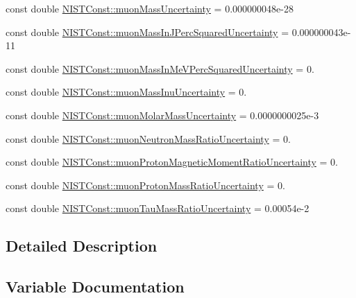 \begin{DoxyCompactItemize}
\item 
const double \hyperlink{group___muon_ga9e5356c55812a9d313f3d6b5a5eca437}{N\+I\+S\+T\+Const\+::muon\+Mass\+Uncertainty} = 0.\+000000048e-\/28
\item 
const double \hyperlink{group___muon_gacf6e9be254af1b85cc1ee1b0a9a3a2c9}{N\+I\+S\+T\+Const\+::muon\+Mass\+In\+J\+Perc\+Squared\+Uncertainty} = 0.\+000000043e-\/11
\item 
const double \hyperlink{group___muon_ga1958d52051686be59d9e4a7ad3a69fa1}{N\+I\+S\+T\+Const\+::muon\+Mass\+In\+Me\+V\+Perc\+Squared\+Uncertainty} = 0.
\item 
const double \hyperlink{group___muon_ga55f39b59c02eb2265b4d62332643a439}{N\+I\+S\+T\+Const\+::muon\+Mass\+Inu\+Uncertainty} = 0.
\item 
const double \hyperlink{group___muon_gac8084ae83ddad95617db5064d8778c11}{N\+I\+S\+T\+Const\+::muon\+Molar\+Mass\+Uncertainty} = 0.\+0000000025e-\/3
\item 
const double \hyperlink{group___muon_gaf1e3125615d29e354cc1ade185c1831c}{N\+I\+S\+T\+Const\+::muon\+Neutron\+Mass\+Ratio\+Uncertainty} = 0.
\item 
const double \hyperlink{group___muon_ga366c3261916ab8b323810bb54cb69edc}{N\+I\+S\+T\+Const\+::muon\+Proton\+Magnetic\+Moment\+Ratio\+Uncertainty} = 0.
\item 
const double \hyperlink{group___muon_ga61cddfc40a08640b83041efd9d4dbbe2}{N\+I\+S\+T\+Const\+::muon\+Proton\+Mass\+Ratio\+Uncertainty} = 0.
\item 
const double \hyperlink{group___muon_gacb8e714cc816309192bb37387da5fa6b}{N\+I\+S\+T\+Const\+::muon\+Tau\+Mass\+Ratio\+Uncertainty} = 0.\+00054e-\/2
\end{DoxyCompactItemize}


\subsection{Detailed Description}


\subsection{Variable Documentation}
\mbox{\label{group___muon_ga344399a1ac3bc2f57614ccdca4f4f1c1}} 

